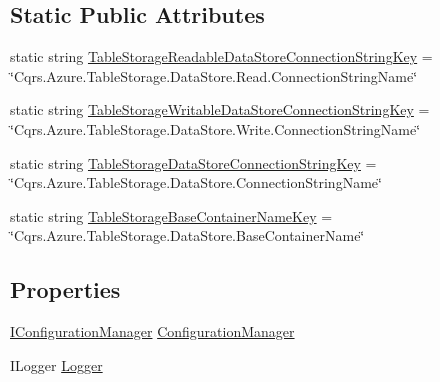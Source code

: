 \subsection*{Static Public Attributes}
\begin{DoxyCompactItemize}
\item 
static string \hyperlink{classCqrs_1_1Azure_1_1BlobStorage_1_1DataStores_1_1TableStorageDataStoreConnectionStringFactory_a412f1d16816e56fa15437a81d5066743_a412f1d16816e56fa15437a81d5066743}{Table\+Storage\+Readable\+Data\+Store\+Connection\+String\+Key} = \char`\"{}Cqrs.\+Azure.\+Table\+Storage.\+Data\+Store.\+Read.\+Connection\+String\+Name\char`\"{}
\item 
static string \hyperlink{classCqrs_1_1Azure_1_1BlobStorage_1_1DataStores_1_1TableStorageDataStoreConnectionStringFactory_ac771ba92adc2e14d7ef49bb3f25ab001_ac771ba92adc2e14d7ef49bb3f25ab001}{Table\+Storage\+Writable\+Data\+Store\+Connection\+String\+Key} = \char`\"{}Cqrs.\+Azure.\+Table\+Storage.\+Data\+Store.\+Write.\+Connection\+String\+Name\char`\"{}
\item 
static string \hyperlink{classCqrs_1_1Azure_1_1BlobStorage_1_1DataStores_1_1TableStorageDataStoreConnectionStringFactory_a386384728fd8f31bee01a6e960ac53d8_a386384728fd8f31bee01a6e960ac53d8}{Table\+Storage\+Data\+Store\+Connection\+String\+Key} = \char`\"{}Cqrs.\+Azure.\+Table\+Storage.\+Data\+Store.\+Connection\+String\+Name\char`\"{}
\item 
static string \hyperlink{classCqrs_1_1Azure_1_1BlobStorage_1_1DataStores_1_1TableStorageDataStoreConnectionStringFactory_aee2a11919d6038a8b7829a53483ea18a_aee2a11919d6038a8b7829a53483ea18a}{Table\+Storage\+Base\+Container\+Name\+Key} = \char`\"{}Cqrs.\+Azure.\+Table\+Storage.\+Data\+Store.\+Base\+Container\+Name\char`\"{}
\end{DoxyCompactItemize}
\subsection*{Properties}
\begin{DoxyCompactItemize}
\item 
\hyperlink{interfaceCqrs_1_1Configuration_1_1IConfigurationManager}{I\+Configuration\+Manager} \hyperlink{classCqrs_1_1Azure_1_1BlobStorage_1_1DataStores_1_1TableStorageDataStoreConnectionStringFactory_ae1dca1e7f76fb10ebfec03dbae0c04b7_ae1dca1e7f76fb10ebfec03dbae0c04b7}{Configuration\+Manager}
\item 
I\+Logger \hyperlink{classCqrs_1_1Azure_1_1BlobStorage_1_1DataStores_1_1TableStorageDataStoreConnectionStringFactory_a4a5a76b15fdc14b23c3ca11becf03ee9_a4a5a76b15fdc14b23c3ca11becf03ee9}{Logger}
\end{DoxyCompactItemize}


